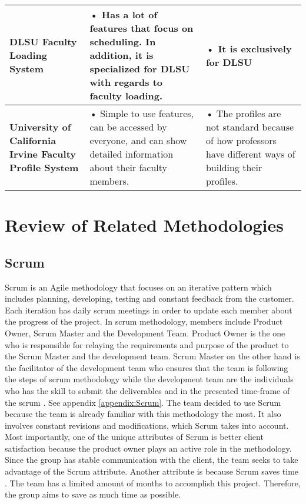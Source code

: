 \begin{table}
\begin{tabular}{p{1.5in} | p{2in} | p{2in}}
\textbf{DLSU Faculty Loading System}                  & 
• Has a lot of features that focus on scheduling. In addition, it is specialized for DLSU with regards to faculty loading.                                                                                                       & • It is exclusively for DLSU\\
\hline

\textbf{University of California Irvine Faculty Profile System} &
• Simple to use features, can be accessed by everyone, and can show detailed information about their faculty members.

& • The profiles are not standard because of how professors have different ways of building their profiles.  \\
\hline

\end{tabular}
\end{table}

\clearpage

\section{Review of Related Methodologies}

\subsection{Scrum}
Scrum is an Agile methodology that focuses on an iterative pattern which includes planning, developing, testing and constant feedback from the customer. Each iteration has daily scrum meetings in order to update each member about the progress of the project. In scrum methodology, members include Product Owner, Scrum Master and the Development Team. Product Owner is the one who is responsible for relaying the requirements and purpose of the product to the Scrum Master and the development team. Scrum Master on the other hand is the facilitator of the development team who ensures that the team is following the steps of scrum methodology while the development team are the individuals who has the skill to submit the deliverables and in the presented time-frame of the scrum \cite{ref:ScrumMethodology}. See appendix \ref{appendix:Scrum}. The team decided to use Scrum because the team is already familiar with this methodology the most. It also involves constant revisions and modifications, which Scrum takes into account. Most importantly, one of the unique attributes of Scrum is better client satisfaction because the product owner plays an active role in the methodology. Since the group has stable communication with the client, the team seeks to take advantage of the Scrum attribute. Another attribute is because Scrum saves time \cite{ref:ReasonsScrum}. The team has a limited amount of months to accomplish this project. Therefore, the group aims to save as much time as possible.


